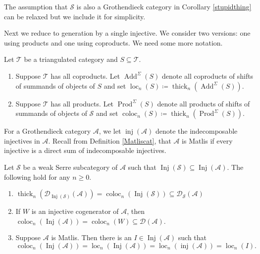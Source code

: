 \documentclass[12pt,oneside]{amsart}
\DeclareMathOperator*{\Inj}{Inj}
\DeclareMathOperator{\coloc}{coloc}
\DeclareMathOperator{\loc}{loc}
\DeclareMathOperator{\thick}{thick}
\DeclareMathOperator{\inj}{inj}
\DeclareMathOperator{\Add}{Add}
\DeclareMathOperator{\Prod}{Prod}
\begin{document}
\begin{remark}
The assumption that $\mathcal{S}$ is also a Grothendieck category in Corollary \ref{stupidthing} can be relaxed but we include it for simplicity. 
\end{remark}

Next we reduce to generation by a single injective. We consider two versions: one using products and one using coproducts. We need some more notation. 


\begin{defn} \label{bigbuildingnotation} Let $\mathcal{T}$ be a triangulated category and $S \subseteq \mathcal{T}$.
\begin{enumerate}

\item  Suppose $\mathcal{T}$ has all coproducts. Let $\Add^\Sigma(S)$ denote all coproducts of shifts of summands of objects of $S$ and set $\loc_n(S) \coloneq \thick_n(\Add^\Sigma(S))$.


\item Suppose $\mathcal{T}$ has all products. Let $\Prod^\Sigma(S)$ denote all products of shifts of summands of objects of $\mathcal{S}$ and set $\coloc_n(S) \coloneq \thick_n(\Prod^\Sigma(S))$.

\end{enumerate}
\end{defn}


For a Grothendieck category $\mathcal{A}$, we let $\inj(\mathcal{A})$ denote the indecomposable injectives in $\mathcal{A}$. Recall from Definition \ref{Matliscat}, that $\mathcal{A}$ is Matlis if every injective is a direct sum of indecomposable injectives.

\begin{lemma} \label{loclemma}
Let $\mathcal{S}$ be a weak Serre subcategory of $\mathcal{A}$ such that $\Inj(\mathcal{S}) \subseteq \Inj(\mathcal{A})$. The following hold for any $n \geq 0$.
\begin{enumerate}

\item $\thick_n(\mathcal{D}_{\Inj(\mathcal{S})}(\mathcal{A})) = \coloc_n(\Inj(\mathcal{S})) \subseteq \mathcal{D}_{\mathcal{S}}(\mathcal{A})$ 

\item If $W$ is an injective cogenerator of $\mathcal{A}$, then $\coloc_n(\Inj(\mathcal{A})) = \coloc_n(W) \subseteq \mathcal{D}(\mathcal{A})$.

\item Suppose $\mathcal{A}$ is Matlis. Then there is an $I \in \Inj(\mathcal{A})$ such that 
\[
\coloc_n(\Inj(\mathcal{A})) = \loc_n(\Inj(\mathcal{A})) = \loc_n(\inj(\mathcal{A})) = \loc_n(I).
\]

\end{enumerate}
\end{lemma}
\end{document}
